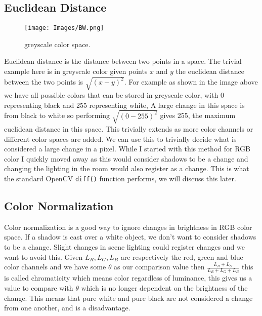 \documentclass[a4paper]{report}
\begin{document}
\subsection{Euclidean Distance}
\begin{figure}[!ht]
\centering
\texttt{[image: Images/BW.png]}
\caption{\label{fig:BW} greyscale color space.}
\end{figure}
Euclidean distance is the distance between two points in a space. The trivial example here is in greyscale color given points $x$ and $y$ the euclidean distance between the two points is $\sqrt{(x-y)^2}$. For example as shown in the image above we have all possible colors that can be stored in greyscale color, with 0 representing black and 255 representing white, A large change in this space is from black to white so performing $\sqrt{(0-255)^2}$ gives 255, the maximum euclidean distance in this space. This trivially extends as more color channels or different color spaces are added. We can use this to trivially decide what is considered a large change in a pixel. While I started with this method for RGB color I quickly moved away as this would consider shadows to be a change and changing the lighting in the room would also register as a change. This is what the standard OpenCV \verb|diff()| function performs, we will discuss this later.

\subsection{Color Normalization}
Color normalization is a good way to ignore changes in brightness in RGB color space. If a shadow is cast over a white object, we don't want to consider shadows to be a change. Slight changes in scene lighting could register changes and we want to avoid this. Given $L_R,L_G,L_B$ are respectively the red, green and blue color channels and we have some $\theta$ as our comparison value then $\frac{L_R + L_G}{L_R + L_G + L_B}$ this is called chromaticity which means color regardless of luminance, this gives us a value to compare with $\theta$ which is no longer dependent on the brightness of the change. This means that pure white and pure black are not considered a change from one another, and is a disadvantage.
\end{document}
